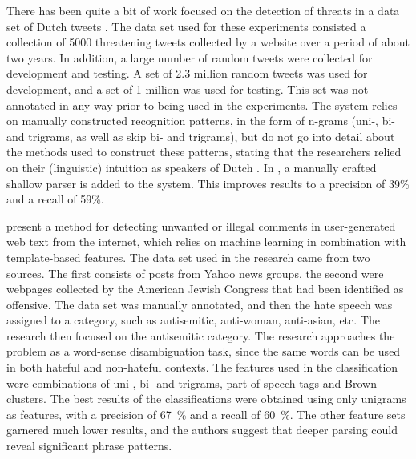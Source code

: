 \documentclass[11pt,letterpaper]{article}
\begin{document}
There has been quite a bit of work focused on the detection of threats
in a data set of Dutch tweets \cite{nellngram2013,nellshallow2013}.
The data set used for these experiments consisted a collection of 5000
threatening tweets collected by a website over a period of about two
years. In addition, a large number of random tweets were collected for
development and testing. A set of 2.3 million random tweets was used
for development, and a set of 1 million was used for testing. This set
was not annotated in any way prior to being used in the experiments.
The system relies on manually constructed recognition patterns, in the
form of n-grams (uni-, bi- and trigrams, as well as skip bi- and
trigrams), but do not go into detail about the methods used to
construct these patterns, stating that the researchers relied on their
(linguistic) intuition as speakers of Dutch \cite{nellngram2013}. In
, a manually crafted shallow parser is added
to the system. This improves results to a precision of 39\% and a
recall of 59\%.

 present a method for detecting unwanted or
illegal comments in user-generated web text from the internet, which
relies on machine learning in combination with template-based
features. The data set used in the research came from two sources. The
first consists of posts from Yahoo news groups, the second were
webpages collected by the American Jewish Congress that had been
identified as offensive. The data set was manually annotated, and then
the hate speech was assigned to a category, such as antisemitic,
anti-woman, anti-asian, etc. The research then focused on the
antisemitic category.  The research approaches the problem as a
word-sense disambiguation task, since the same words can be used in
both hateful and non-hateful contexts. The features used in the
classification were combinations of uni-, bi- and trigrams,
part-of-speech-tags and Brown clusters.  The best results of the
classifications were obtained using only unigrams as features, with a
precision of 67~\% and a recall of 60~\%. The other feature sets
garnered much lower results, and the authors suggest that deeper
parsing could reveal significant phrase patterns.
\end{document}
